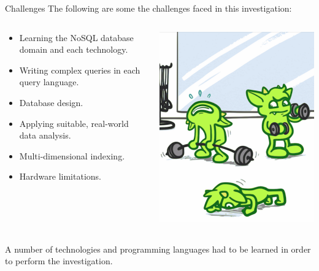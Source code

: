 \begin{frame}{Challenges}
    The following are some the challenges faced in this investigation:
    \vfill
    \begin{columns}
        \begin{column}{.6\textwidth}
            \begin{itemize}
                \item Learning the NoSQL database domain and each technology.
                \item Writing complex queries in each query language.
                \item Database design.
                \item Applying suitable, real-world data analysis.
                \item Multi-dimensional indexing.
                \item Hardware limitations.
            \end{itemize}
            \end{column}%
            \hfill%
            \begin{column}{.39\textwidth}
            \centering
            \includegraphics[width=0.7\columnwidth]{img/gremlin-images/gremlin-gym-crop.png}
        \end{column}%
    \end{columns}
    \vfill
    A number of technologies and programming languages had to be learned in order to perform the investigation.
    \vfill
    \parnotes
\end{frame}


